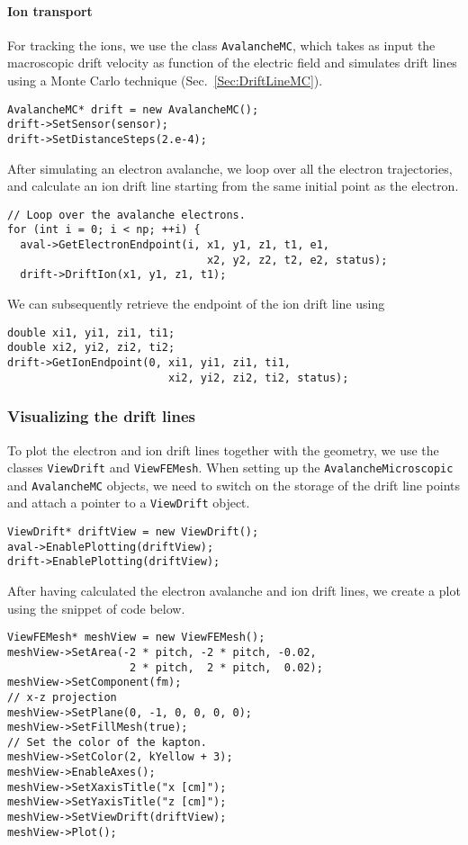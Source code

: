 \paragraph{Ion transport}
For tracking the ions, we use the class \texttt{AvalancheMC}, 
which takes as input the macroscopic drift velocity as 
function of the electric field and simulates drift lines using a 
Monte Carlo technique (Sec.~\ref{Sec:DriftLineMC}).
\begin{lstlisting}
AvalancheMC* drift = new AvalancheMC();
drift->SetSensor(sensor);
drift->SetDistanceSteps(2.e-4);
\end{lstlisting}
After simulating an electron avalanche, we loop over all the electron
trajectories, and calculate an ion drift line starting from the same
initial point as the electron.
\begin{lstlisting}
// Loop over the avalanche electrons.
for (int i = 0; i < np; ++i) {
  aval->GetElectronEndpoint(i, x1, y1, z1, t1, e1,
                               x2, y2, z2, t2, e2, status);
  drift->DriftIon(x1, y1, z1, t1);
\end{lstlisting}
We can subsequently retrieve the endpoint of the ion drift line using
\begin{lstlisting}
double xi1, yi1, zi1, ti1;
double xi2, yi2, zi2, ti2;
drift->GetIonEndpoint(0, xi1, yi1, zi1, ti1,
                         xi2, yi2, zi2, ti2, status);
\end{lstlisting}
\subsubsection{Visualizing the drift lines}
To plot the electron and ion drift lines together with the geometry, 
we use the classes \texttt{ViewDrift} and \texttt{ViewFEMesh}. 
When setting up the \texttt{AvalancheMicroscopic} and \texttt{AvalancheMC} 
objects, we need to switch on the storage of the drift line points and 
attach a pointer to a \texttt{ViewDrift} object.
\begin{lstlisting}
ViewDrift* driftView = new ViewDrift();
aval->EnablePlotting(driftView);
drift->EnablePlotting(driftView);
\end{lstlisting}
After having calculated the electron avalanche and ion drift lines, we create a plot using the snippet of code below.
\begin{lstlisting}
ViewFEMesh* meshView = new ViewFEMesh();
meshView->SetArea(-2 * pitch, -2 * pitch, -0.02,
                   2 * pitch,  2 * pitch,  0.02);
meshView->SetComponent(fm);
// x-z projection
meshView->SetPlane(0, -1, 0, 0, 0, 0);
meshView->SetFillMesh(true); 
// Set the color of the kapton.
meshView->SetColor(2, kYellow + 3);
meshView->EnableAxes();
meshView->SetXaxisTitle("x [cm]");
meshView->SetYaxisTitle("z [cm]");
meshView->SetViewDrift(driftView);
meshView->Plot();
\end{lstlisting}
